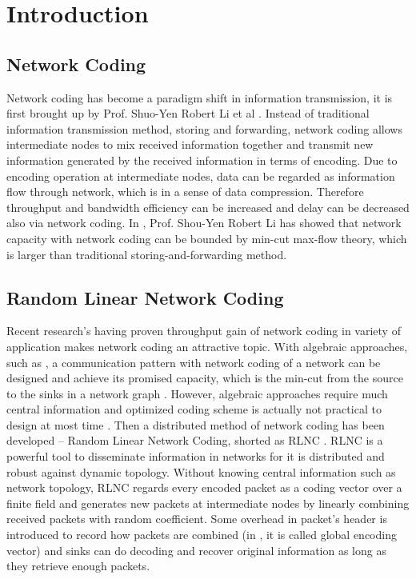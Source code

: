 \documentclass[conference]{IEEEtran}
\begin{document}
\section{Introduction}
\subsection{Network Coding}
Network coding has become a paradigm shift in information transmission, it is first brought up by Prof. Shuo-Yen Robert Li et al \cite{RobertLi}. Instead of traditional information transmission method, storing and forwarding, network coding allows intermediate nodes to mix received information together and transmit new information generated by the received information in terms of encoding. Due to encoding operation at intermediate nodes, data can be regarded as information flow through network, which is in a sense of data compression. Therefore throughput and bandwidth efficiency can be increased and delay can be decreased also via network coding. In \cite{RobertLi}, Prof. Shou-Yen Robert Li has showed that network capacity with network coding can be bounded by min-cut max-flow theory, which is larger than traditional storing-and-forwarding method.


\subsection{Random Linear Network Coding}
Recent research's having proven throughput gain of network coding in variety of application makes network coding an attractive topic. With algebraic approaches, such as \cite{algebraicNC}, a communication pattern with network coding of a network can be designed and achieve its promised capacity, which is the min-cut from the source to the sinks in a network graph \cite{RobertLi}. However, algebraic approaches require much central information and optimized coding scheme is actually not practical to design at most time \cite{insufficiency}. Then a distributed method of network coding has been developed – Random Linear Network Coding, shorted as RLNC \cite{RLNC}. RLNC is a powerful tool to disseminate information in networks for it is distributed and robust against dynamic topology. Without knowing central information such as network topology, RLNC regards every encoded packet as a coding vector over a finite field  and generates new packets at intermediate nodes by linearly combining received packets with random coefficient. Some overhead in packet's header is introduced to record how packets are combined (in \cite{RLNC}, it is called global encoding vector) and sinks can do decoding and recover original information as long as they retrieve enough packets.
\end{document}
